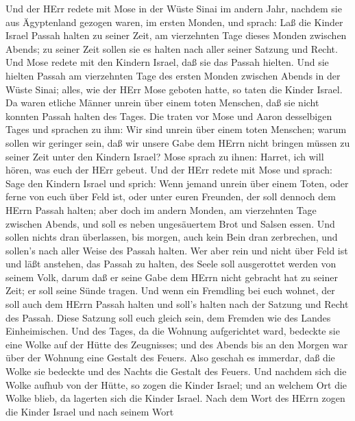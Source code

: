  Und der HErr redete mit Mose in der Wüste Sinai im andern
Jahr, nachdem sie aus Ägyptenland gezogen waren, im ersten Monden, und
sprach:  Laß die Kinder Israel Passah halten zu seiner Zeit,
 am vierzehnten Tage dieses Monden zwischen Abends; zu
seiner Zeit sollen sie es halten nach aller seiner Satzung und Recht.
 Und Mose redete mit den Kindern Israel, daß sie das Passah
hielten.  Und sie hielten Passah am vierzehnten Tage des
ersten Monden zwischen Abends in der Wüste Sinai; alles, wie der HErr
Mose geboten hatte, so taten die Kinder Israel.  Da waren
etliche Männer unrein über einem toten Menschen, daß sie nicht konnten
Passah halten des Tages. Die traten vor Mose und Aaron desselbigen Tages
 und sprachen zu ihm: Wir sind unrein über einem toten
Menschen; warum sollen wir geringer sein, daß wir unsere Gabe dem HErrn
nicht bringen müssen zu seiner Zeit unter den Kindern Israel?
 Mose sprach zu ihnen: Harret, ich will hören, was euch der
HErr gebeut.  Und der HErr redete mit Mose und sprach:
 Sage den Kindern Israel und sprich: Wenn jemand unrein
über einem Toten, oder ferne von euch über Feld ist, oder unter euren
Freunden, der soll dennoch dem HErrn Passah halten;  aber
doch im andern Monden, am vierzehnten Tage zwischen Abends, und soll es
neben ungesäuertem Brot und Salsen essen.  Und sollen
nichts dran überlassen, bis morgen, auch kein Bein dran zerbrechen, und
sollen's nach aller Weise des Passah halten.  Wer aber rein
und nicht über Feld ist und läßt anstehen, das Passah zu halten, des
Seele soll ausgerottet werden von seinem Volk, darum daß er seine Gabe
dem HErrn nicht gebracht hat zu seiner Zeit; er soll seine Sünde tragen.
 Und wenn ein Fremdling bei euch wohnet, der soll auch dem
HErrn Passah halten und soll's halten nach der Satzung und Recht des
Passah. Diese Satzung soll euch gleich sein, dem Fremden wie des Landes
Einheimischen.  Und des Tages, da die Wohnung aufgerichtet
ward, bedeckte sie eine Wolke auf der Hütte des Zeugnisses; und des
Abends bis an den Morgen war über der Wohnung eine Gestalt des Feuers.
 Also geschah es immerdar, daß die Wolke sie bedeckte und
des Nachts die Gestalt des Feuers.  Und nachdem sich die
Wolke aufhub von der Hütte, so zogen die Kinder Israel; und an welchem
Ort die Wolke blieb, da lagerten sich die Kinder Israel. 
Nach dem Wort des HErrn zogen die Kinder Israel und nach seinem Wort
